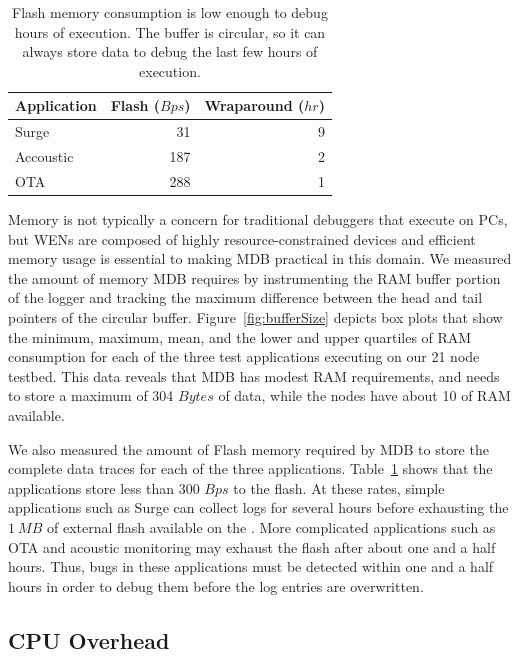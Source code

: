 \begin{table}
  \centering
  {
    \begin{tabular}{|l|r|r|} \hline
      Application & Flash ($Bps$) & Wraparound ($hr$)\\ \hline\hline
      Surge & 31 & 9 \\ \hline
      Accoustic & 187 & 2 \\ \hline
      OTA & 288 & 1 \\ \hline
  \end{tabular}}
  \caption[Flash memory consumption]{Flash memory consumption is low enough to debug hours of
      execution. The buffer is circular, so it can always store data to debug the
      last few hours of execution.}
  \label{table:flashCapacity}
\end{table}

Memory is not typically a concern for traditional debuggers that execute on PCs,
but WENs are composed of highly resource-constrained devices and efficient
memory usage is essential to making MDB practical in this domain.  We measured
the amount of memory MDB requires by instrumenting the RAM buffer portion of
the logger and tracking the maximum difference between the head and tail
pointers of the circular buffer. Figure~\ref{fig:bufferSize} depicts box plots
that show the minimum, maximum, mean, and the lower and upper quartiles of RAM
consumption for each of the three test applications executing on our 21 node
testbed. This data reveals that MDB has modest RAM requirements, and needs to
store a maximum of 304 $Bytes$ of data, while the \tmotesky nodes have about 10\KB
of RAM available.

We also measured the amount of Flash memory required by MDB to store the
complete data traces for each of the three applications.
Table~\ref{table:flashCapacity} shows that the applications store less than
300 $Bps$ to the flash.  At these rates, simple applications such as Surge can
collect logs for several hours before exhausting the $1 \ MB$ of external flash
available on the \tmotesky.  More complicated applications such as OTA and
acoustic monitoring may exhaust the flash after about one and a half
hours. Thus, bugs in these applications must be detected within one and a half
hours in order to debug them before the log entries are overwritten.

\subsection{CPU Overhead} \label{CPUoverhead}

